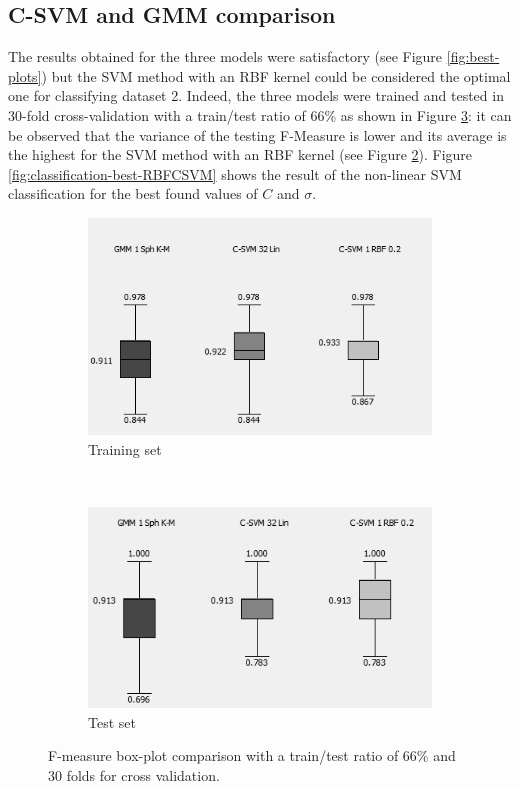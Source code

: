\documentclass[a4paper,10pt]{article}
\begin{document}
\subsection{C-SVM and GMM comparison}
\label{sec:comparison}

The results obtained for the three models were satisfactory (see Figure \ref{fig:best-plots}) but the SVM method with an RBF kernel could be considered the optimal one for classifying dataset 2. Indeed, the three models were trained and tested in 30-fold cross-validation with a train/test ratio of 66\% as shown in Figure \ref{fig:F-Measure-boxes}: it can be observed that the variance of the testing F-Measure is lower and its average is the highest for the SVM method with an RBF kernel (see Figure \ref{fig:Compare-best-classification-training}). Figure \ref{fig:classification-best-RBFCSVM} shows the result of the non-linear SVM classification for the best found values of $C$ and $\sigma$. 



\begin{figure}[H]
\centering
	\begin{subfigure}[t]{0.3\textwidth} 
      \centering
      \includegraphics[height=3.2 cm]{pictures/Compare-best-classification-training}
      \caption{Training set}
      \label{fig:Compare-best-classification-training}
    \end{subfigure}%
    ~
    \begin{subfigure}[t]{0.3\textwidth} 
      \centering
      \includegraphics[height=3.2 cm]{pictures/Compare-best-classification-test}
      \caption{Test set}
      \label{fig:Compare-best-classification-training}
     \end{subfigure}
     \caption{F-measure box-plot comparison with a train/test ratio of 66\% and 30 folds for cross validation.}
     \label{fig:F-Measure-boxes}
\end{figure}
\end{document}
